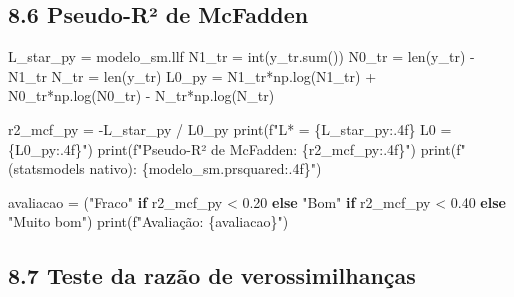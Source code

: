 \documentclass[
  letterpaper,
  DIV=11,
  numbers=noendperiod]{scrartcl}
\newenvironment{Shaded}{\begin{snugshade}}{\end{snugshade}}
\newcommand{\BuiltInTok}[1]{\textcolor[rgb]{0.00,0.23,0.31}{#1}}
\newcommand{\ControlFlowTok}[1]{\textcolor[rgb]{0.00,0.23,0.31}{\textbf{#1}}}
\newcommand{\FloatTok}[1]{\textcolor[rgb]{0.68,0.00,0.00}{#1}}
\newcommand{\NormalTok}[1]{\textcolor[rgb]{0.00,0.23,0.31}{#1}}
\newcommand{\OperatorTok}[1]{\textcolor[rgb]{0.37,0.37,0.37}{#1}}
\newcommand{\SpecialCharTok}[1]{\textcolor[rgb]{0.37,0.37,0.37}{#1}}
\newcommand{\SpecialStringTok}[1]{\textcolor[rgb]{0.13,0.47,0.30}{#1}}
\newcommand{\StringTok}[1]{\textcolor[rgb]{0.13,0.47,0.30}{#1}}
\begin{document}
\subsection{8.6 Pseudo-R² de McFadden}\label{pseudo-ruxb2-de-mcfadden-2}

\begin{Shaded}
\begin{Highlighting}[]
\NormalTok{L\_star\_py }\OperatorTok{=}\NormalTok{ modelo\_sm.llf}
\NormalTok{N1\_tr     }\OperatorTok{=} \BuiltInTok{int}\NormalTok{(y\_tr.}\BuiltInTok{sum}\NormalTok{())}
\NormalTok{N0\_tr     }\OperatorTok{=} \BuiltInTok{len}\NormalTok{(y\_tr) }\OperatorTok{{-}}\NormalTok{ N1\_tr}
\NormalTok{N\_tr      }\OperatorTok{=} \BuiltInTok{len}\NormalTok{(y\_tr)}
\NormalTok{L0\_py     }\OperatorTok{=}\NormalTok{ N1\_tr}\OperatorTok{*}\NormalTok{np.log(N1\_tr) }\OperatorTok{+}\NormalTok{ N0\_tr}\OperatorTok{*}\NormalTok{np.log(N0\_tr) }\OperatorTok{{-}}\NormalTok{ N\_tr}\OperatorTok{*}\NormalTok{np.log(N\_tr)}

\NormalTok{r2\_mcf\_py }\OperatorTok{=} \OperatorTok{{-}}\NormalTok{L\_star\_py }\OperatorTok{/}\NormalTok{ L0\_py}
\BuiltInTok{print}\NormalTok{(}\SpecialStringTok{f"L* = }\SpecialCharTok{\{}\NormalTok{L\_star\_py}\SpecialCharTok{:.4f\}}\SpecialStringTok{   L0 = }\SpecialCharTok{\{}\NormalTok{L0\_py}\SpecialCharTok{:.4f\}}\SpecialStringTok{"}\NormalTok{)}
\BuiltInTok{print}\NormalTok{(}\SpecialStringTok{f"Pseudo{-}R² de McFadden: }\SpecialCharTok{\{}\NormalTok{r2\_mcf\_py}\SpecialCharTok{:.4f\}}\SpecialStringTok{"}\NormalTok{)}
\BuiltInTok{print}\NormalTok{(}\SpecialStringTok{f"(statsmodels nativo):   }\SpecialCharTok{\{}\NormalTok{modelo\_sm}\SpecialCharTok{.}\NormalTok{prsquared}\SpecialCharTok{:.4f\}}\SpecialStringTok{"}\NormalTok{)}

\NormalTok{avaliacao }\OperatorTok{=}\NormalTok{ (}\StringTok{"Fraco"}       \ControlFlowTok{if}\NormalTok{ r2\_mcf\_py }\OperatorTok{\textless{}} \FloatTok{0.20} \ControlFlowTok{else}
             \StringTok{"Bom"}         \ControlFlowTok{if}\NormalTok{ r2\_mcf\_py }\OperatorTok{\textless{}} \FloatTok{0.40} \ControlFlowTok{else}
             \StringTok{"Muito bom"}\NormalTok{)}
\BuiltInTok{print}\NormalTok{(}\SpecialStringTok{f"Avaliação: }\SpecialCharTok{\{}\NormalTok{avaliacao}\SpecialCharTok{\}}\SpecialStringTok{"}\NormalTok{)}
\end{Highlighting}
\end{Shaded}

\subsection{8.7 Teste da razão de
verossimilhanças}\label{teste-da-razuxe3o-de-verossimilhanuxe7as-1}
\end{document}
